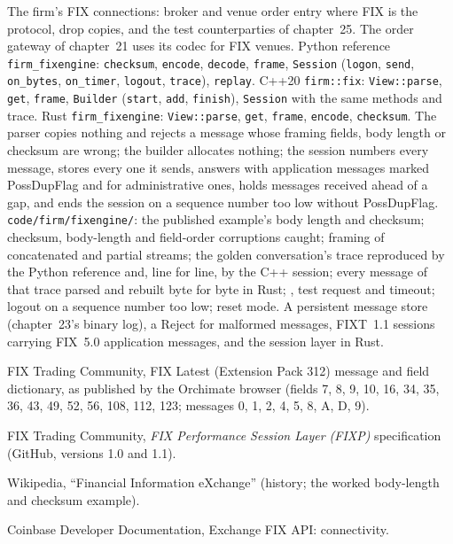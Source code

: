 \begin{build}
 The firm's FIX connections: broker and venue order entry where FIX is the protocol, drop copies, and the
test counterparties of chapter~25. The order gateway of chapter~21 uses its codec for FIX venues.
 Python reference \texttt{firm\_fixengine}: \texttt{checksum}, \texttt{encode}, \texttt{decode},
\texttt{frame}, \texttt{Session} (\texttt{logon}, \texttt{send}, \texttt{on\_bytes}, \texttt{on\_timer}, \texttt{logout},
\texttt{trace}), \texttt{replay}. C++20 \texttt{firm::fix}: \texttt{View::parse}, \texttt{get}, \texttt{frame},
\texttt{Builder} (\texttt{start}, \texttt{add}, \texttt{finish}), \texttt{Session} with the same methods and trace. Rust
\texttt{firm\_fixengine}: \texttt{View::parse}, \texttt{get}, \texttt{frame}, \texttt{encode}, \texttt{checksum}.
 The parser copies nothing and rejects a message whose framing fields, body length or checksum are wrong; the
builder allocates nothing; the session numbers every message, stores every one it sends, answers  with
application messages marked PossDupFlag and  for administrative ones, holds messages received ahead of a gap, and
ends the session on a sequence number too low without PossDupFlag.
 \texttt{code/firm/fixengine/}: the published example's body length and checksum; checksum,
body-length and field-order corruptions caught; framing of concatenated and partial streams; the golden conversation's trace
reproduced by the Python reference and, line for line, by the C++ session; every message of that trace parsed and rebuilt byte
for byte in Rust; , test request and timeout; logout on a sequence number too low; reset mode.
 A persistent message store (chapter~23's binary log), a Reject for malformed messages, FIXT~1.1 sessions
carrying FIX~5.0 application messages, and the session layer in Rust.
\end{build}

\begin{omsources}
\item FIX Trading Community, FIX Latest (Extension Pack 312) message and field dictionary, as published by the Orchimate
browser (fields 7, 8, 9, 10, 16, 34, 35, 36, 43, 49, 52, 56, 108, 112, 123; messages 0, 1, 2, 4, 5, 8, A, D, 9).
\item FIX Trading Community, \emph{FIX Performance Session Layer (FIXP)} specification (GitHub, versions 1.0 and 1.1).
\item Wikipedia, ``Financial Information eXchange'' (history; the worked body-length and checksum example).
\item Coinbase Developer Documentation, Exchange FIX API: connectivity.
\end{omsources}

